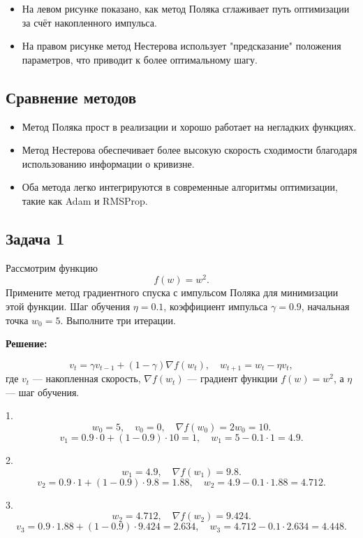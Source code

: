 \begin{itemize}
	\item На левом рисунке показано, как метод Поляка сглаживает путь оптимизации за счёт накопленного импульса.
	\item На правом рисунке метод Нестерова использует "предсказание" положения параметров, что приводит к более оптимальному шагу.
\end{itemize}

\subsection*{Сравнение методов}
\begin{itemize}
	\item Метод Поляка прост в реализации и хорошо работает на негладких функциях.

	\item Метод Нестерова обеспечивает более высокую скорость сходимости благодаря использованию информации о кривизне.

	\item Оба метода легко интегрируются в современные алгоритмы оптимизации, такие как Adam и RMSProp.
\end{itemize}

\subsection*{Задача 1}
Рассмотрим функцию
\[
	f(w) = w^2.
\]
Примените метод градиентного спуска с импульсом Поляка для минимизации этой функции. Шаг обучения $\eta = 0.1$, коэффициент импульса $\gamma = 0.9$, начальная точка $w_0 = 5$. Выполните три итерации.

\textbf{Решение:}

\[
	v_t = \gamma v_{t-1} + (1 - \gamma) \nabla f(w_t), \quad w_{t+1} = w_t - \eta v_t,
\]
где $v_t$ — накопленная скорость, $\nabla f(w_t)$ — градиент функции $f(w) = w^2$, а $\eta$ — шаг обучения.

1.
\[
	w_0 = 5, \quad v_0 = 0, \quad \nabla f(w_0) = 2w_0 = 10.
\]
\[
	v_1 = 0.9 \cdot 0 + (1 - 0.9) \cdot 10 = 1, \quad w_1 = 5 - 0.1 \cdot 1 = 4.9.
\]

2.
\[
	w_1 = 4.9, \quad \nabla f(w_1) = 9.8.
\]
\[
	v_2 = 0.9 \cdot 1 + (1 - 0.9) \cdot 9.8 = 1.88, \quad w_2 = 4.9 - 0.1 \cdot 1.88 = 4.712.
\]

3.
\[
	w_2 = 4.712, \quad \nabla f(w_2) = 9.424.
\]
\[
	v_3 = 0.9 \cdot 1.88 + (1 - 0.9) \cdot 9.424 = 2.634, \quad w_3 = 4.712 - 0.1 \cdot 2.634 = 4.448.
\]

